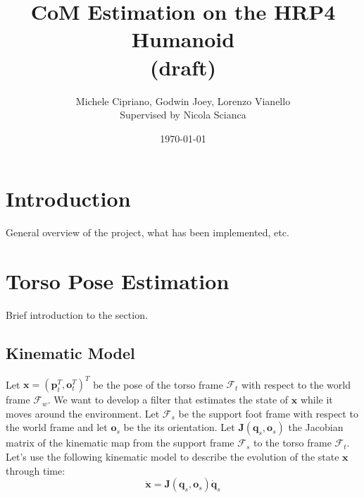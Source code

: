 \documentclass[a4paper]{article}
\begin{document}
\title{CoM Estimation on the HRP4 Humanoid\\(draft)}
\author{Michele Cipriano, Godwin Joey, Lorenzo Vianello\\Supervised by Nicola Scianca}
\date{\today}
\maketitle



\section{Introduction}

General overview of the project, what has been implemented,
etc\cite{DBLP:journals/arobots/OrioloPRV16}.


\section{Torso Pose Estimation}
Brief introduction to the section.

\subsection{Kinematic Model}
Let $\bm{x} = (\bm{p}_t^T, \bm{o}_t^T)^T$ be the pose of the torso frame $\mathcal{F}_t$
with respect to the world frame $\mathcal{F}_w$. We want to
develop a filter that estimates the state of $\bm{x}$ while
it moves around the environment. Let $\mathcal{F}_s$ be the
support foot frame with respect to the world frame and let
$\bm{o}_s$ be the its orientation.
Let $\bm{J}(\bm{q}_s, \bm{o}_s)$ the Jacobian
matrix of the kinematic map from the support frame 
$\mathcal{F}_s$ to the torso frame $\mathcal{F}_t$.
Let's use the following kinematic model to describe the
evolution of the state $\bm{x}$ through time:
\begin{equation}
    \bm{\dot{x}} = \bm{J}(\bm{q}_s, \bm{o}_s) \bm{\dot{q}}_s
    \label{eq:hrp4-kinematic-model}
\end{equation}
\end{document}
